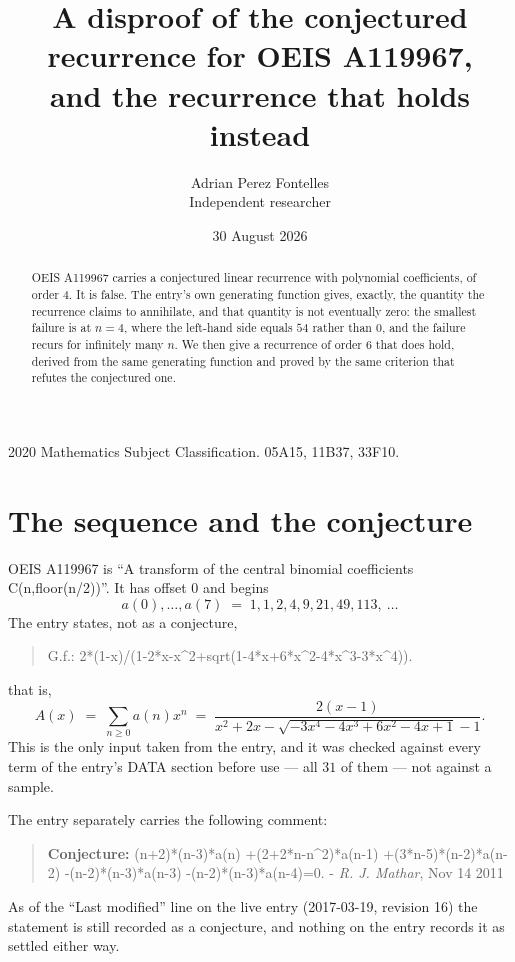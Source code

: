 \documentclass[11pt,a4paper]{article}
\title{A disproof of the conjectured recurrence for OEIS A119967,\\ and the recurrence
that holds instead}
\author{Adrian Perez Fontelles\\ \small Independent researcher}
\date{30 August 2026}
\theoremstyle{plain}
\theoremstyle{definition}
\begin{document}
\maketitle

\begin{abstract}
OEIS A119967 carries a conjectured linear recurrence with polynomial coefficients, of
order 4. It is false. The entry's own generating function gives, exactly, the
quantity the recurrence claims to annihilate, and that quantity is not eventually zero:
the smallest failure is at $n=4$, where the left-hand side equals $54$
rather than $0$, and the failure recurs for infinitely many $n$. We then give a recurrence
of order 6 that does hold, derived from the same generating function and proved by
the same criterion that refutes the conjectured one.
\end{abstract}

\noindent\small 2020 Mathematics Subject Classification. 05A15, 11B37, 33F10.\normalsize

\section{The sequence and the conjecture}

OEIS A119967 is ``A transform of the central binomial coefficients C(n,floor(n/2))''. It has offset $0$ and begins
\[
a(0),\dots,a(7)\;=\;1, 1, 2, 4, 9, 21, 49, 113,\ \dots
\]
The entry states, not as a conjecture,
\begin{quote}\small
G.f.: 2*(1-x)/(1-2*x-x\^{}2+sqrt(1-4*x+6*x\^{}2-4*x\^{}3-3*x\^{}4)).
\end{quote}
that is,
\begin{equation}\label{eq:gf}
A(x)\;=\;\sum_{n\ge 0}a(n)x^{n}\;=\;\frac{2 \left(x - 1\right)}{x^{2} + 2 x - \sqrt{- 3 x^{4} - 4 x^{3} + 6 x^{2} - 4 x + 1} - 1} .
\end{equation}
This is the only input taken from the entry, and it was checked against every term of the
entry's DATA section before use --- all $31$ of them --- not against a sample.

The entry separately carries the following comment:
\begin{quote}\small
\textbf{Conjecture:} (n+2)*(n-3)*a(n) +(2+2*n-n\^{}2)*a(n-1) +(3*n-5)*(n-2)*a(n-2) -(n-2)*(n-3)*a(n-3) -(n-2)*(n-3)*a(n-4)=0. - \emph{R. J. Mathar}, Nov 14 2011
\end{quote}
As of the ``Last modified'' line on the live entry (2017-03-19, revision 16) the
statement is still recorded as a conjecture, and nothing on the entry records it as
settled either way.
\end{document}
